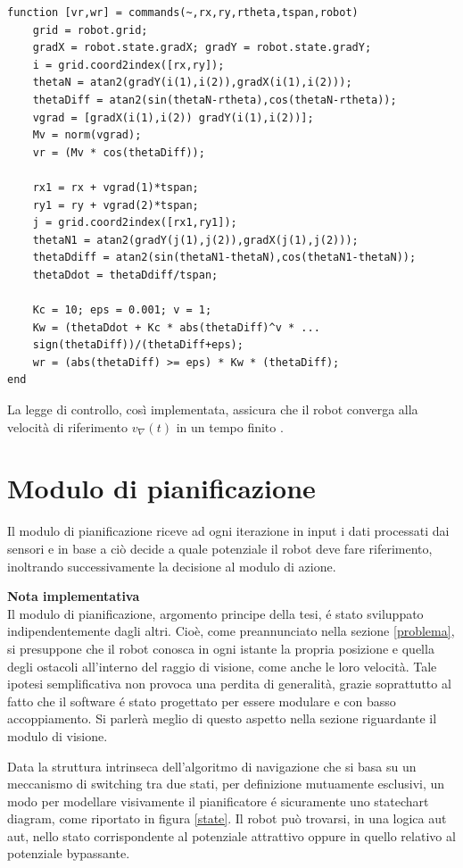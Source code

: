 \documentclass[14pt,a4paper]{extarticle}
\begin{document}
\begin{lstlisting}[caption=Metodo che genera i comandi di velocità]
function [vr,wr] = commands(~,rx,ry,rtheta,tspan,robot)
	grid = robot.grid; 
	gradX = robot.state.gradX; gradY = robot.state.gradY;
	i = grid.coord2index([rx,ry]);
	thetaN = atan2(gradY(i(1),i(2)),gradX(i(1),i(2)));
	thetaDiff = atan2(sin(thetaN-rtheta),cos(thetaN-rtheta));
	vgrad = [gradX(i(1),i(2)) gradY(i(1),i(2))];            
	Mv = norm(vgrad);
	vr = (Mv * cos(thetaDiff));
      
	rx1 = rx + vgrad(1)*tspan;
	ry1 = ry + vgrad(2)*tspan;
	j = grid.coord2index([rx1,ry1]);
	thetaN1 = atan2(gradY(j(1),j(2)),gradX(j(1),j(2)));   
	thetaDdiff = atan2(sin(thetaN1-thetaN),cos(thetaN1-thetaN));
	thetaDdot = thetaDdiff/tspan;
	
	Kc = 10; eps = 0.001; v = 1;
	Kw = (thetaDdot + Kc * abs(thetaDiff)^v * ...
	sign(thetaDiff))/(thetaDiff+eps);
	wr = (abs(thetaDiff) >= eps) * Kw * (thetaDiff);
end
\end{lstlisting}
La legge di controllo, così implementata, assicura che il robot converga alla velocità di riferimento \(v_{\nabla}(t)\) in un tempo finito \cite{dalfonso}.

\newpage
\section{Modulo di pianificazione}
Il modulo di pianificazione riceve ad ogni iterazione in input i dati processati dai sensori e in base a ciò decide a quale potenziale il robot deve fare riferimento, inoltrando successivamente la decisione al modulo di azione. 
\begin{nota}
\textbf{Nota implementativa} \\ Il modulo di pianificazione, argomento principe della tesi, é stato sviluppato indipendentemente dagli altri. Cioè, come preannunciato nella sezione \ref{problema}, si presuppone che il robot conosca in ogni istante la propria posizione e quella degli ostacoli all'interno del raggio di visione, come anche le loro velocità. Tale ipotesi semplificativa non provoca una perdita di generalità, grazie soprattutto al fatto che il software é stato progettato per essere modulare e con basso accoppiamento. Si parlerà meglio di questo aspetto nella sezione riguardante il modulo di visione.
\end{nota}
Data la struttura intrinseca dell'algoritmo di navigazione che si basa su un meccanismo di switching tra due stati, per definizione mutuamente esclusivi, un modo per modellare visivamente il pianificatore é sicuramente uno statechart diagram, come riportato in figura \ref{state}. Il robot può trovarsi, in una logica aut aut, nello stato corrispondente al potenziale attrattivo oppure in quello relativo al potenziale bypassante.
\end{document}
